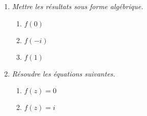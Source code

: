 \documentclass[12pt]{article}
\begin{document}
\begin{multicols}{2}

  \begin{enumerate}
  \item[1.] \textit{Mettre les résultats sous forme algébrique.}

    \begin{enumerate}
    \item[a)] $f(0)$
    \item[b)] $f(-i)$
    \item[c)] $f(1)$
    \end{enumerate}

  \item[2.] \textit{Résoudre les équations suivantes.}
    \begin{enumerate}
    \item[a)] $f(z) = 0$
    \item[b)] $f(z) = i$
    \end{enumerate}

  \end{enumerate}

\end{multicols}
\end{document}
